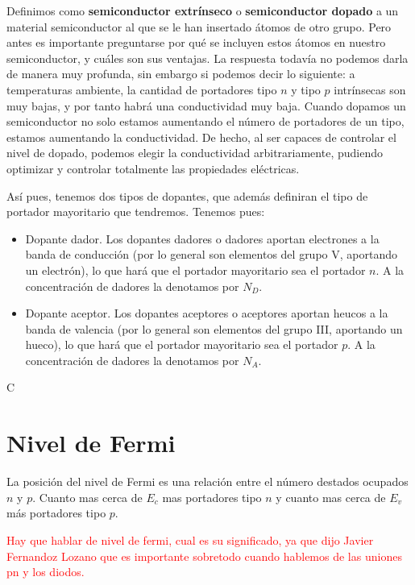 Definimos como \textbf{semiconductor extrínseco} o \textbf{semiconductor dopado} a un material semiconductor al que se le han insertado átomos de otro grupo. Pero antes es importante preguntarse por qué se incluyen estos átomos en nuestro semiconductor, y cuáles son sus ventajas. La respuesta todavía no podemos darla de manera muy profunda, sin embargo si podemos decir lo siguiente: a temperaturas ambiente, la cantidad de portadores tipo $n$ y tipo $p$ intrínsecas son muy bajas, y por tanto habrá una conductividad muy baja. Cuando dopamos un semiconductor no solo estamos aumentando el número de portadores de un tipo, estamos aumentando la conductividad. De hecho, al ser capaces de controlar el nivel de dopado, podemos elegir la conductividad arbitrariamente, pudiendo optimizar y controlar totalmente las propiedades eléctricas.

Así pues, tenemos dos tipos de dopantes, que además definiran el tipo de portador mayoritario que tendremos. Tenemos pues:

\begin{itemize}
	\item Dopante dador. Los dopantes dadores o dadores aportan electrones a la banda de conducción (por lo general son elementos del grupo V, aportando un electrón), lo que hará que el portador mayoritario sea el portador $n$. A la concentración de dadores la denotamos por $N_D$.
	\item Dopante aceptor. Los dopantes aceptores o aceptores aportan heucos a la banda de valencia (por lo general son elementos del grupo III, aportando un hueco), lo que hará que el portador mayoritario sea el portador $p$. A la concentración de dadores la denotamos por $N_A$.
\end{itemize}
C





\section{Nivel de Fermi}

La posición del nivel de Fermi es una relación entre el número destados ocupados $n$ y $p$. Cuanto mas cerca de $E_c$ mas portadores tipo $n$ y cuanto mas cerca de $E_v$ más portadores tipo $p$. 

\begin{Anotacion}
	\textcolor{red}{Hay que hablar de nivel de fermi, cual es su significado, ya que dijo Javier Fernandoz Lozano que es importante sobretodo cuando hablemos de las uniones pn y los diodos. }
\end{Anotacion}


